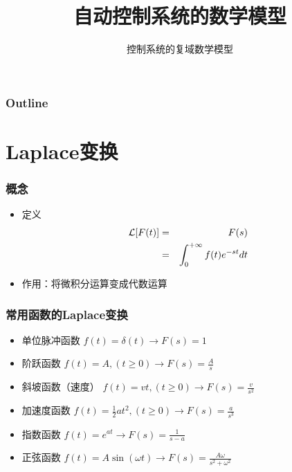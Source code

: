 \documentclass{beamer}
\subtitle{控制系统的复域数学模型}
\title{自动控制系统的数学模型}
\author{}
\date{}
\begin{document}
\maketitle

\begin{frame}
\frametitle{Outline}
\setcounter{tocdepth}{3}
\tableofcontents
\end{frame}













\section{Laplace变换}
\label{sec-1}
\begin{frame}
\frametitle{概念}
\label{sec-1-1}

\begin{itemize}
\item <2->定义
      \begin{eqnarray*}
      {\cal L}[F(t)] &=& F(s) \\
       &=& \int_0^{+\infty}f(t)e^{-st}dt
      \end{eqnarray*}
\item <3->作用：将微积分运算变成代数运算
\end{itemize}
\end{frame}
\begin{frame}
\frametitle{常用函数的Laplace变换}
\label{sec-1-2}

\begin{itemize}
\item <2->单位脉冲函数 $f(t)=\delta(t) \rightarrow   F(s)=1$
\item <3->阶跃函数 $f(t)=A,(t\geq 0) \rightarrow   F(s)=\frac{A}{s}$
\item <4->斜坡函数（速度）  $f(t)=vt,(t\geq0) \rightarrow F(s)=\frac{v}{s^2}$
\item <5->加速度函数  $f(t)=\frac{1}{2}at^2,(t\geq 0) \rightarrow  F(s)=\frac{a}{s^3}$
\item <6->指数函数 $f(t)=e^{at} \rightarrow  F(s)=\frac{1}{s-a}$
\item <7->正弦函数 $f(t)=A\sin(\omega t)\rightarrow F(s)=\frac{A\omega}{s^2+\omega^2}$
\end{itemize}
\end{frame}
\end{document}
